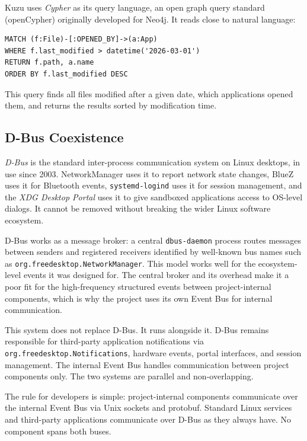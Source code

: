 Kuzu uses \emph{Cypher} as its query language, an open graph query standard
(openCypher) originally developed for Neo4j. It reads close to natural language:

\begin{lstlisting}[language={}]
MATCH (f:File)-[:OPENED_BY]->(a:App)
WHERE f.last_modified > datetime('2026-03-01')
RETURN f.path, a.name
ORDER BY f.last_modified DESC
\end{lstlisting}

This query finds all files modified after a given date, which applications
opened them, and returns the results sorted by modification time.

\subsection{D-Bus Coexistence}
\label{sec:dbus}

\emph{D-Bus} is the standard inter-process communication system on Linux
desktops, in use since 2003. NetworkManager uses it to report network state
changes, BlueZ uses it for Bluetooth events, \texttt{systemd-logind} uses it
for session management, and the \emph{XDG Desktop Portal} uses it to give
sandboxed applications access to OS-level dialogs. It cannot be removed without
breaking the wider Linux software ecosystem.

D-Bus works as a message broker: a central \texttt{dbus-daemon} process routes
messages between senders and registered receivers identified by well-known bus
names such as \texttt{org.freedesktop.NetworkManager}. This model works well for
the ecosystem-level events it was designed for. The central broker and its
overhead make it a poor fit for the high-frequency structured events between
project-internal components, which is why the project uses its own Event Bus for
internal communication.

This system does not replace D-Bus. It runs alongside it. D-Bus remains
responsible for third-party application notifications via
\texttt{org.freedesktop.Notifications}, hardware events, portal interfaces, and
session management. The internal Event Bus handles communication between
project components only. The two systems are parallel and non-overlapping.

The rule for developers is simple: project-internal components communicate over
the internal Event Bus via Unix sockets and protobuf. Standard Linux services
and third-party applications communicate over D-Bus as they always have. No
component spans both buses.
